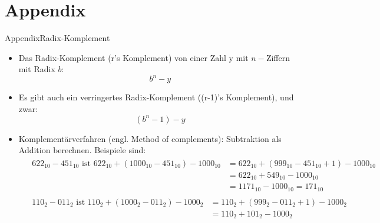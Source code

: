 
\section{Appendix}

\begin{frame}[allowframebreaks]{Appendix}{Radix-Komplement}
  \begin{itemize}
    \item Das \alert{Radix-Komplement} (r's Komplement) von einer Zahl y mit $n-$Ziffern mit Radix $b$:
      \begin{equation*}
        b^n-y
      \end{equation*}
    \item Es gibt auch ein \alert{verringertes Radix-Komplement} ((r-1)'s Komplement), und zwar:
      \begin{equation*}
        (b^n-1)-y
      \end{equation*}
      \cite{OnlineRechnerNumerischeKomplemente}
    \item \alert{Komplementärverfahren (engl. Method of complements\cite{MethodComplements2023}):} Subtraktion als Addition berechnen. Beispiele sind: 
            \begin{align*}
                    &\begin{aligned}
                            622_{10} - 451_{10} \text{ ist } 622_{10} + (1000_{10} - 451_{10}) - 1000_{10} &= 622_{10} + (999_{10} - 451_{10} + 1) - 1000_{10}\\
                                                                                                   &= 622_{10} + 549_{10} - 1000_{10}\\
                                                                                                   &= 1171_{10} - 1000_{10} = 171_{10}
                    \end{aligned}\\[0.25cm]
                    &\begin{aligned}
                            110_{2} - 011_{2} \text{ ist } 110_{2} + (1000_{2} - 011_{2}) - 1000_{2} &= 110_{2} + (999_{2} - 011_{2} + 1) - 1000_{2}\\
                                                                                             &= 110_{2} + 101_{2} - 1000_{2}\\ 

\end{aligned}
\end{align*}
\end{itemize}
\end{frame}
